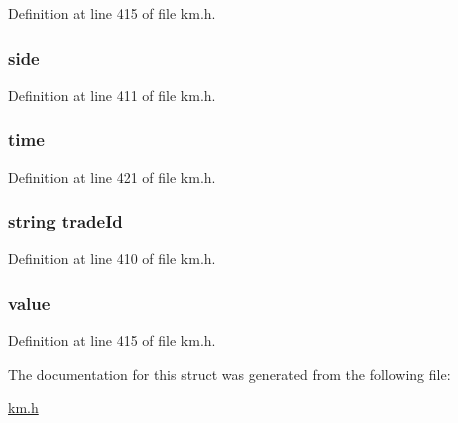 Definition at line 415 of file km.\+h.

\subsubsection[{\texorpdfstring{side}{side}}]{ side}\hypertarget{struct_k_1_1m_trade_afc5924267a11b19eb2f198a919a12351}{}\label{struct_k_1_1m_trade_afc5924267a11b19eb2f198a919a12351}


Definition at line 411 of file km.\+h.

\subsubsection[{\texorpdfstring{time}{time}}]{ time}\hypertarget{struct_k_1_1m_trade_a8c7be9fac36539b28a92dd5240ec377b}{}\label{struct_k_1_1m_trade_a8c7be9fac36539b28a92dd5240ec377b}


Definition at line 421 of file km.\+h.

\subsubsection[{\texorpdfstring{trade\+Id}{tradeId}}]{\setlength{\rightskip}{0pt plus 5cm}string trade\+Id}\hypertarget{struct_k_1_1m_trade_a1a30d92defc429c8bd698cdacdb9749f}{}\label{struct_k_1_1m_trade_a1a30d92defc429c8bd698cdacdb9749f}


Definition at line 410 of file km.\+h.

\subsubsection[{\texorpdfstring{value}{value}}]{ value}\hypertarget{struct_k_1_1m_trade_a2c33cdf6b415658a577653196c59739a}{}\label{struct_k_1_1m_trade_a2c33cdf6b415658a577653196c59739a}


Definition at line 415 of file km.\+h.



The documentation for this struct was generated from the following file\+:\begin{DoxyCompactItemize}
\item 
\hyperlink{km_8h}{km.\+h}\end{DoxyCompactItemize}
